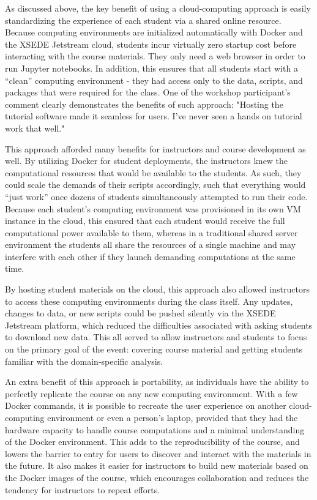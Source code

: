 As discussed above, the key benefit of using a cloud-computing approach is
easily standardizing the experience of each student via a shared online
resource. Because computing environments are initialized automatically with
Docker and the XSEDE Jetstream cloud, students incur virtually zero startup cost
before interacting with the course materials. They only need a web browser in
order to run Jupyter notebooks. In addition, this ensures that all students
start with a ``clean'' computing environment - they had access only to the data,
scripts, and packages that were required for the class. One of the workshop
participant's comment clearly demonstrates the benefits of such approach: "Hosting
the tutorial software made it seamless for users. I've never seen a hands on
tutorial work that well."

This approach afforded many benefits for instructors and course development as
well. By utilizing Docker for student deployments, the instructors knew the
computational resources that would be available to the students. As such, they
could scale the demands of their scripts accordingly, such that everything would
``just work'' once dozens of students simultaneously attempted to run their
code. Because each student's computing environment was provisioned in its own VM
instance in the cloud, this ensured that each student would receive the full
computational power available to them, whereas in a traditional shared server
environment the students all share the resources of a single machine and may
interfere with each other if they launch demanding computations at the same
time.

By hosting student materials on the cloud, this approach also allowed instructors
to access these computing environments during the class itself. Any updates,
changes to data, or new scripts could be pushed silently via the XSEDE Jetstream
platform, which reduced the difficulties associated with asking students to
download new data. This all served to allow instructors and students to focus on
the primary goal of the event: covering course material and getting students
familiar with the domain-specific analysis.

An extra benefit of this approach is portability, as individuals have the
ability to perfectly replicate the course on any new computing environment. With
a few Docker commands, it is possible to recreate the user experience on another
cloud-computing environment or even a person's laptop, provided that they had
the hardware capacity to handle course computations and a minimal understanding
of the Docker environment. This adds to the reproducibility of the course, and
lowers the barrier to entry for users to discover and interact with the
materials in the future. It also makes it easier for instructors to build new
materials based on the Docker images of the course, which encourages
collaboration and reduces the tendency for instructors to repeat efforts.


